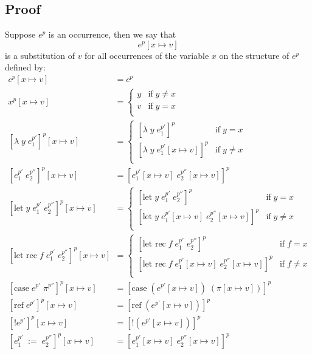 \documentclass[../../master.tex]{subfiles}
\begin{document}
\subsection{Proof}
\iffalse
\begin{definition}[Substitutions]
	Suppose $e^p$ is an occurrence, then we say that
	$$e^p[x\mapsto v]$$
	is a substitution of $v$ for all occurrences of the variable $x$ on the structure of $e^p$ defined by:
	\begin{align*}
		c^p[x\mapsto v]&=c^p\\
		x^p[x\mapsto v]&=	\left\{\begin{matrix}
									y & \mbox{if}\;y \neq x\\ 
									v & \mbox{if}\;y = x\\ 
								\end{matrix}\right.\\
		[\lambda\;y\;e_1^{p'}]^p[x\mapsto v]&=
			\left\{\begin{matrix}
				[\lambda\;y\;e_1^{p'}]^p & \mbox{if}\;y = x\\ 
				[\lambda\;y\;e_1^{p'}[x\mapsto v]]^p & \mbox{if}\;y \neq x\\
			\end{matrix}\right.\\
		[e_1^{p'}\;e_2^{p''}]^p[x\mapsto v]&=[e_1^{p'}[x\mapsto v]\;e_2^{p''}[x\mapsto v]]^p\\
		[\mbox{let}\;y\;e_1^{p'}\;e_2^{p''}]^p[x\mapsto v]&=	
			\left\{\begin{matrix}
				[\mbox{let}\;y\;e_1^{p'}\;e_2^{p''}]^p & \mbox{if}\;y = x\\ 
				[\mbox{let}\;y\;e_1^{p'}[x\mapsto v]\;e_2^{p''}[x\mapsto v]]^p & \mbox{if}\;y \neq x\\ 
			\end{matrix}\right.\\
		[\mbox{let rec}\;f\;e_1^{p'}\;e_2^{p''}]^p[x\mapsto v]&=
			\left\{\begin{matrix}
				[\mbox{let rec}\;f\;e_1^{p'}\;e_2^{p''}]^p & \mbox{if}\;f = x\\ 
				[\mbox{let rec}\;f\;e_1^{p'}[x\mapsto v]\;e_2^{p''}[x\mapsto v]]^p & \mbox{if}\;f \neq x\\ 
			\end{matrix}\right.\\
		[\mbox{case}\;e^{p'}\;\pi^{p''}]^p[x\mapsto v]&=[\mbox{case}\;(e^{p'}[x\mapsto v])\;(\pi[x\mapsto v])]^p\\
		[\mbox{ref}\;e^{p'}]^p[x\mapsto v]&=[\mbox{ref}\;(e^{p'}[x\mapsto v])]^p\\
		[!e^{p'}]^p[x\mapsto v]&=[!(e^{p'}[x\mapsto v])]^p\\
		[e_1^{p'}\;:=\;e_2^{p''}]^p[x\mapsto v]&=[e_1^{p'}[x\mapsto v]\;e_2^{p''}[x\mapsto v]]^p\\
	\end{align*}
\end{definition}
\end{document}
